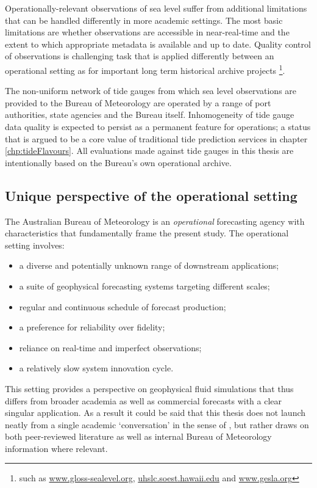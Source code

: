 Operationally-relevant observations of sea level suffer from additional limitations that can be handled differently in more academic settings.   The most basic limitations are whether observations are accessible in near-real-time and the extent to which appropriate metadata is available and up to date.  
Quality control of observations is challenging task that is applied differently between an operational setting as for important long term historical archive projects \footnote{such as \url{www.gloss-sealevel.org}, \url{uhslc.soest.hawaii.edu} and \url{www.gesla.org}}.

The non-uniform network of tide gauges from which sea level observations are provided to the Bureau of Meteorology are operated by a range of port authorities, state agencies and the Bureau itself. Inhomogeneity of tide gauge data quality is expected to persist as a permanent feature for operations; a status that is argued to be a core value of traditional tide prediction services in chapter \ref{chp:tideFlavours}. All evaluations made against tide gauges in this thesis are intentionally based on the Bureau's own operational archive.

\subsection{Unique perspective of the operational setting}
\label{S:operational_setting}

The Australian Bureau of Meteorology is an \emph{operational} forecasting agency with characteristics that fundamentally frame the present study. The operational setting involves:
\begin{itemize}
    \item a diverse and potentially unknown range of downstream applications;
    \item a suite of geophysical forecasting systems targeting different scales;
    \item regular and continuous schedule of forecast production;
    \item a preference for reliability over fidelity;
    \item reliance on real-time and imperfect observations;
    \item a relatively slow system innovation cycle.
\end{itemize}
This setting provides a perspective on geophysical fluid simulations that thus differs from broader academia as well as commercial forecasts with a clear singular application.   As a result it could be said that this thesis does not launch neatly from a single academic `conversation' in the sense of \citeauthor{Booth:2009vy}, but rather draws on both peer-reviewed literature as well as internal Bureau of Meteorology information where relevant.

